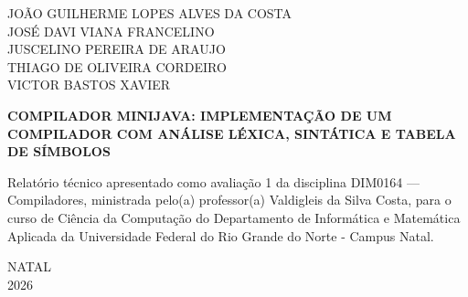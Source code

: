 
\begin{center}
    
    \setcounter{page}{1} %
    \thispagestyle{empty}

    JOÃO GUILHERME LOPES ALVES DA COSTA\\
    JOSÉ DAVI VIANA FRANCELINO\\
    JUSCELINO PEREIRA DE ARAUJO\\
    THIAGO DE OLIVEIRA CORDEIRO\\
    VICTOR BASTOS XAVIER\\
    \vspace{5.2cm}
    
    \textbf{COMPILADOR MINIJAVA: IMPLEMENTAÇÃO DE UM COMPILADOR COM ANÁLISE LÉXICA, SINTÁTICA E TABELA DE SÍMBOLOS}\\
    \vspace{5.2cm}
    
\end{center}

\hspace{8cm} %
\begin{minipage}{7cm}
Relatório técnico apresentado como avaliação 1 da disciplina DIM0164 — Compiladores, ministrada pelo(a) professor(a) Valdigleis da Silva Costa, para o curso de Ciência da Computação do Departamento de Informática e Matemática Aplicada da Universidade Federal do Rio Grande do Norte - Campus Natal. 
\end{minipage}
\vspace{4.5cm}

\begin{center}
    NATAL\\
    2026
\end{center}

\singlespacing

\newpage
\tableofcontents
\thispagestyle{empty}